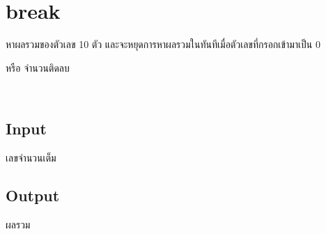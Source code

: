 \documentclass{article}
\begin{document}
\section*{break}

{หาผลรวมของตัวเลข 10 ตัว และจะหยุดการหาผลรวมในทันทีเมื่อตัวเลขที่กรอกเข้ามาเป็น 0

หรือ จำนวนติดลบ}\\



\subsection*{Input}
เลขจำนวนเต็ม



\subsection*{Output}
ผลรวม
\end{document}
